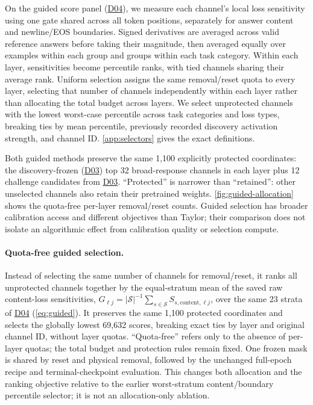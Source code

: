 \documentclass[10pt,letterpaper]{article}
\DeclareRobustCommand{\dataset}[1]{\hyperlink{dataset-#1}{\textnormal{#1}}}
\begin{document}
On the guided score panel (\dataset{D04}), we measure each channel's local loss sensitivity using one gate shared
across all token positions, separately for answer content and newline/EOS
boundaries. Signed derivatives are averaged across valid reference answers
before taking their magnitude, then averaged equally over examples within
each group and groups within each task category. Within each layer,
sensitivities become percentile ranks, with tied channels sharing their
average rank. Uniform selection assigns the same removal/reset quota to
every layer, selecting that number of channels independently within each
layer rather than allocating the total budget across layers. We select
unprotected channels with the lowest worst-case
percentile across task categories and loss types, breaking ties by mean
percentile, previously recorded discovery activation strength, and channel
ID. \autoref{app:selectors} gives the exact definitions.

Both guided methods preserve the same 1,100 explicitly protected coordinates:
the discovery-frozen (\dataset{D03}) top 32 broad-response channels in each layer plus
12 challenge candidates from \dataset{D03}. ``Protected'' is narrower than ``retained'':
other unselected channels also retain their pretrained weights.
\autoref{fig:guided-allocation} shows the quota-free per-layer
removal/reset counts.
Guided selection has broader calibration access and different objectives
than Taylor; their comparison does not isolate an algorithmic effect from
calibration quality or selection compute.

\paragraph{Quota-free guided selection.}
Instead of selecting the same number of channels for 
removal/reset, it ranks all unprotected channels together by the
equal-stratum mean of the saved raw content-loss sensitivities,
$G_{\ell j}=|\mathcal S|^{-1}\sum_{s\in\mathcal S}S_{s,\mathrm{content},\ell j}$,
over the same 23 strata of \dataset{D04} (\autoref{eq:guided}). It preserves the same
1,100 protected coordinates and selects the globally lowest 69,632
scores, breaking exact ties by layer and original channel ID, without
layer quotas. ``Quota-free'' refers only to the 
absence of per-layer quotas; the total budget and protection rules remain fixed.
One frozen mask is shared by reset and physical removal, followed by the
unchanged full-epoch recipe and terminal-checkpoint evaluation.
This changes both allocation and the ranking objective relative to the
earlier worst-stratum content/boundary percentile selector; it is not an
allocation-only ablation.
\end{document}

